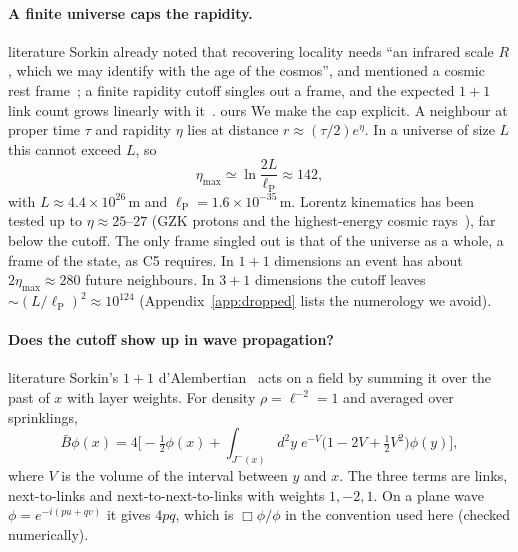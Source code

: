 \documentclass[11pt,a4paper]{article}
\newcommand{\tagbox}[2]{\textsf{\scriptsize\colorbox{#1!12}{\textcolor{#1!70!black}{#2}}}}
\newcommand{\lit}{\tagbox{blue}{literature}}
\newcommand{\ours}{\tagbox{orange}{ours}}
\newcommand{\lP}{\ell_{\mathrm P}}
\begin{document}
\paragraph{A finite universe caps the rapidity.} \lit{} Sorkin already noted that recovering locality needs ``an infrared scale $R$, which we may identify with the age of the cosmos'', and mentioned a cosmic rest frame~\cite{Sorkin07}; a finite rapidity cutoff singles out a frame, and the expected $1+1$ link count grows linearly with it~\cite{BK26}. \ours{} We make the cap explicit. A neighbour at proper time $\tau$ and rapidity $\eta$ lies at distance $r\approx(\tau/2)e^{\eta}$. In a universe of size $L$ this cannot exceed $L$, so
\begin{equation}
\eta_{\max}\simeq\ln\frac{2L}{\lP}\approx142,
\end{equation}
with $L\approx4.4\times10^{26}$\,m and $\lP=1.6\times10^{-35}$\,m. Lorentz kinematics has been tested up to $\eta\approx25$--$27$ (GZK protons and the highest-energy cosmic rays~\cite{CG99}), far below the cutoff. The only frame singled out is that of the universe as a whole, a frame of the state, as C5 requires. In $1+1$ dimensions an event has about $2\eta_{\max}\approx280$ future neighbours. In $3+1$ dimensions the cutoff leaves $\sim(L/\lP)^2\approx10^{124}$ (Appendix~\ref{app:dropped} lists the numerology we avoid).

\paragraph{Does the cutoff show up in wave propagation?} \lit{} Sorkin's $1+1$ d'Alembertian~\cite{Sorkin07} acts on a field by summing it over the past of $x$ with layer weights. For density $\rho=\ell^{-2}=1$ and averaged over sprinklings,
\begin{equation}
\bar B\phi(x)=4\Big[-\tfrac12\phi(x)+\int_{J^-(x)}\!d^2y\;e^{-V}\big(1-2V+\tfrac12V^2\big)\phi(y)\Big],
\label{eq:box}
\end{equation}
where $V$ is the volume of the interval between $y$ and $x$. The three terms are links, next-to-links and next-to-next-to-links with weights $1,-2,1$. On a plane wave $\phi=e^{-i(pu+qv)}$ it gives $4pq$, which is $\Box\phi/\phi$ in the convention used here (checked numerically).
\end{document}
